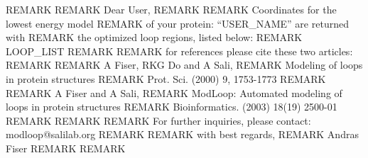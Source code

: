 REMARK 
REMARK  Dear User,
REMARK    
REMARK  Coordinates for the lowest energy model 
REMARK  of your protein: ``USER_NAME''  are returned with 
REMARK  the optimized loop regions, listed below: 
REMARK  LOOP_LIST
REMARK     
REMARK  for references please cite these two articles:
REMARK
REMARK     A Fiser, RKG Do and A Sali, 
REMARK     Modeling of loops in protein structures
REMARK     Prot. Sci. (2000) 9, 1753-1773
REMARK
REMARK     A Fiser and A Sali,
REMARK     ModLoop: Automated modeling of loops in protein structures
REMARK     Bioinformatics. (2003) 18(19) 2500-01
REMARK
REMARK
REMARK  For further inquiries, please contact: modloop@salilab.org
REMARK     
REMARK  with best regards,
REMARK  Andras Fiser
REMARK
REMARK
